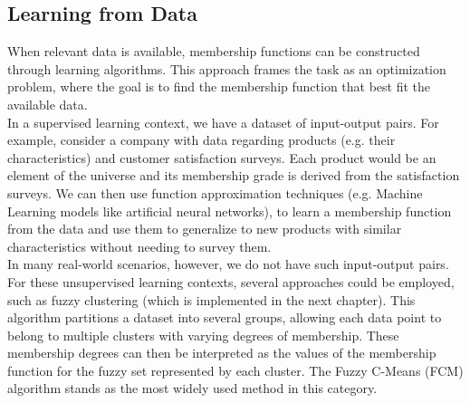 \subsection{Learning from Data}
When relevant data is available, membership functions can be constructed through learning algorithms. This approach frames the task as an optimization problem, where the goal is to find the membership function that best fit the available data.\\

In a supervised learning context, we have a dataset of input-output pairs. For example, consider a company with data regarding products (e.g. their characteristics) and customer satisfaction surveys. Each product would be an element of the universe and its membership grade is derived from the satisfaction surveys. We can then use function approximation techniques (e.g. Machine Learning models like artificial neural networks), to learn a membership function from the data and use them to generalize to new products with similar characteristics without needing to survey them.\\

In many real-world scenarios, however, we do not have such input-output pairs. For these unsupervised learning contexts, several approaches could be employed, such as fuzzy clustering (which is implemented in the next chapter). This algorithm partitions a dataset into several groups, allowing each data point to belong to multiple clusters with varying degrees of membership. These membership degrees can then be interpreted as the values of the membership function for the fuzzy set represented by each cluster. The Fuzzy C-Means (FCM) algorithm \cite{bezdek1984fcm} stands as the most widely used method in this category.

